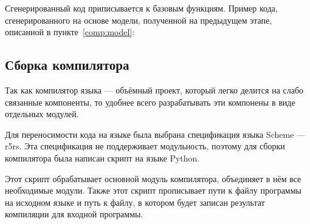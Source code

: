     Сгенерированный код приписывается к базовым функциям.
    \clearpage
    Пример кода, сгенерированного на основе модели, полученной на предыдущем этапе, описанной в пункте~\ref{comp:model}:

    

    \subsection{Сборка компилятора}
    Так как компилятор языка --- объёмный проект, который легко делится на слабо связанные компоненты, то удобнее всего разрабатывать эти компонены в виде отдельных модулей.

    Для переносимости кода на языке была выбрана спецификация языка Scheme --- r5rs.
    Эта спецификация не поддерживает модульность, поэтому для сборки компилятора была написан скрипт на языке Python.

    Этот скрипт обрабатывает основной модуль компилятора, объединяет в нём все необходимые модули.
    Также этот скрипт прописывает пути к файлу программы на исходном языке и путь к файлу, в котором будет записан результат компиляции для входной программы.
